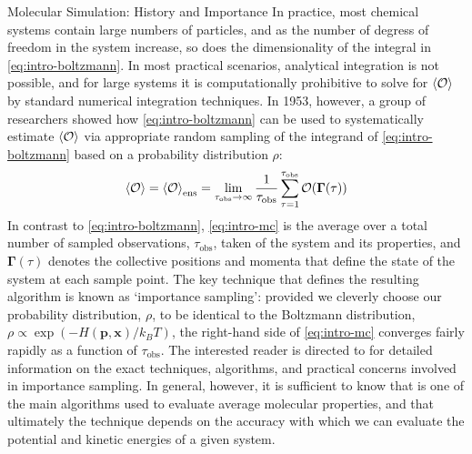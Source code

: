 \begin{section}{Molecular Simulation: History and Importance}
In practice, most chemical systems contain large numbers of particles, and as the
number of degress of freedom in the system increase, so does the
dimensionality of the integral in \cref{eq:intro-boltzmann}. 
In most practical scenarios, analytical integration is not possible, and for
large systems it is
computationally prohibitive to solve for $\braket{\mathcal{O}}$ by standard numerical
integration techniques.
\cite{allen1989computer}
In 1953, however, a group of
researchers\cite{Metropolis1953} showed how \cref{eq:intro-boltzmann} can be
used to systematically estimate
$\braket{\mathcal{O}}$ via appropriate random sampling of the integrand of
\cref{eq:intro-boltzmann} based on a probability distribution $\rho$:
\cite{Harrison2010,allen1989computer}
%
\begin{align}
\label{eq:intro-mc}
\braket{\mathcal{O}} = \braket{\mathcal{O}}_{\text{ens}} 
= \lim_{\tau_{\text{obs}} \to \infty} \frac{1}{\tau_{\text{obs}}}
\sum\limits_{\tau = 1}^{\tau_{\text{obs}}}
\mathcal{O}(\bm{\Gamma}(\tau))
\end{align}
%
In contrast to \cref{eq:intro-boltzmann}, \cref{eq:intro-mc} is the average
over a total number of sampled observations, ${\tau_{\text{obs}}}$, taken of the
system and its properties, 
and $\bm{\Gamma}(\tau)$ denotes the collective positions and
momenta that define the state of the system at each sample point.
The key technique that
defines the resulting \mc algorithm is known as `importance sampling':
provided we cleverly choose our probability distribution, $\rho$, to be
identical to the Boltzmann distribution, $\rho \propto \exp (-H(\bm p, \bm x)/k_BT)$, the
right-hand side of \cref{eq:intro-mc} converges fairly rapidly as a function
of ${\tau_{\text{obs}}}$.  The interested reader is directed to
\citet{allen1989computer} for detailed information on the exact techniques,
algorithms, and practical concerns involved in importance sampling. In
general, however, it is sufficient to know that \mc is one of the main
algorithms used to evaluate average molecular properties,
and that ultimately the \mc technique depends on the accuracy with which we can
evaluate the potential and kinetic energies of a given system.


\end{section}
